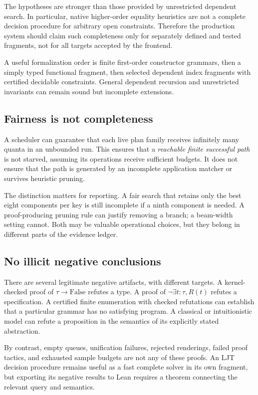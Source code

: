 \documentclass[11pt,a4paper]{article}
\newcommand{\code}[1]{\texttt{\detokenize{#1}}}
\theoremstyle{remark}
\begin{document}
The hypotheses are stronger than those provided by unrestricted dependent \code{MetaM} search. In particular, native higher-order equality heuristics are not a complete decision procedure for arbitrary open constraints. Therefore the production system should claim such completeness only for separately defined and tested fragments, not for all targets accepted by the frontend.

A useful formalization order is finite first-order constructor grammars, then a simply typed functional fragment, then selected dependent index fragments with certified decidable constraints. General dependent recursion and unrestricted invariants can remain sound but incomplete extensions.

\subsection{Fairness is not completeness}

A scheduler can guarantee that each live plan family receives infinitely many quanta in an unbounded run. This ensures that a \emph{reachable finite successful path} is not starved, assuming its operations receive sufficient budgets. It does not ensure that the path is generated by an incomplete application matcher or survives heuristic pruning.

The distinction matters for reporting. A fair search that retains only the best eight components per key is still incomplete if a ninth component is needed. A proof-producing pruning rule can justify removing a branch; a beam-width setting cannot. Both may be valuable operational choices, but they belong in different parts of the evidence ledger.

\subsection{No illicit negative conclusions}

There are several legitimate negative artifacts, with different targets. A kernel-checked proof of $\tau\to\mathrm{False}$ refutes a type. A proof of $\neg\exists t:\tau,R(t)$ refutes a specification. A certified finite enumeration with checked refutations can establish that a particular grammar has no satisfying program. A classical or intuitionistic model can refute a proposition in the semantics of its explicitly stated abstraction.

By contrast, empty queues, unification failures, rejected renderings, failed proof tactics, and exhausted sample budgets are not any of these proofs. An LJT decision procedure remains useful as a fast complete solver in its own fragment, but exporting its negative results to Lean requires a theorem connecting the relevant query and semantics.
\end{document}
